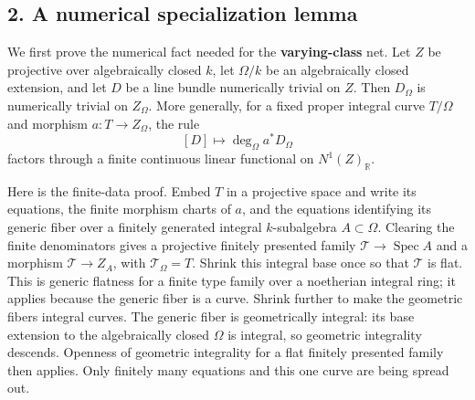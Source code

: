 \documentclass[
  10pt,
]{article}
\begin{document}
\subsection{2. A numerical specialization
lemma}\label{a-numerical-specialization-lemma}

We first prove the numerical fact needed for the \textbf{varying-class}
net. Let \(Z\) be projective over algebraically closed \(k\), let
\(\Omega/k\) be an algebraically closed extension, and let \(D\) be a
line bundle numerically trivial on \(Z\). Then \(D_\Omega\) is
numerically trivial on \(Z_\Omega\). More generally, for a fixed proper
integral curve \(T/\Omega\) and morphism \(a:T\to Z_\Omega\), the rule
\[[D]\longmapsto \deg_\Omega a^*D_\Omega                                      \tag{2.1}\]
factors through a finite continuous linear functional on
\(N^1(Z)_\mathbb R\).

Here is the finite-data proof. Embed \(T\) in a projective space and
write its equations, the finite morphism charts of \(a\), and the
equations identifying its generic fiber over a finitely generated
integral \(k\)-subalgebra \(A\subset\Omega\). Clearing the finite
denominators gives a projective finitely presented family
\(\mathcal T\to\operatorname{Spec}A\) and a morphism
\(\mathcal T\to Z_A\), with \(\mathcal T_\Omega=T\). Shrink this
integral base once so that \(\mathcal T\) is flat. This is generic
flatness for a finite type family over a noetherian integral ring; it
applies because the generic fiber is a curve. Shrink further to make the
geometric fibers integral curves. The generic fiber is geometrically
integral: its base extension to the algebraically closed \(\Omega\) is
integral, so geometric integrality descends. Openness of geometric
integrality for a flat finitely presented family then applies. Only
finitely many equations and this one curve are being spread out.
\end{document}
